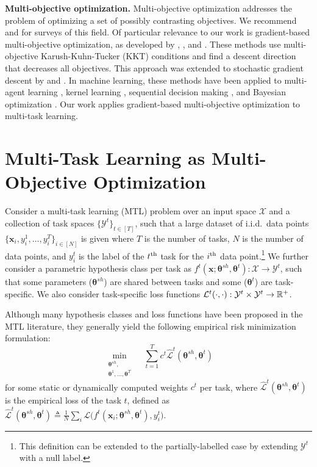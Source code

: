 \documentclass{article}
\def\xx{\mathbf{x}}
\def\lL{\mathcal{L}}
\def\xX{\mathcal{X}}
\def\yY{\mathcal{Y}}
\def\btheta{{\bm\theta}}
\begin{document}
\noindent \textbf{Multi-objective optimization.}
Multi-objective optimization addresses the problem of optimizing a set of possibly contrasting objectives. We recommend \citet{Miettinen1999} and \citet{Ehrgott2005} for surveys of this field. Of particular relevance to our work is gradient-based multi-objective optimization, as developed by \citet{Fliege2000}, \citet{Schaffler2002}, and \citet{Desideri2012}. These methods use multi-objective Karush-Kuhn-Tucker (KKT) conditions \citep{Kuhn1951} and find a descent direction that decreases all objectives. This approach was extended to stochastic gradient descent by \citet{Peitz2017} and \citet{Poirion2017}. In machine learning, these methods have been applied to multi-agent learning \citep{Ghish2013, Pirotta2016, Parisi2014}, kernel learning \citep{Cong2014}, sequential decision making \citep{Whiteson2018}, and Bayesian optimization \citep{Shah2016, Lobato2016}. Our work applies gradient-based multi-objective optimization to multi-task learning.
 

\section{Multi-Task Learning as Multi-Objective Optimization}
\label{sec:method}


Consider a multi-task learning (MTL) problem over an input space $\xX$ and a collection of task spaces $\{\yY^t\}_{t \in [T]}$, such that a large dataset of i.i.d.\ data points $\{\xx_i, y_i^1,\ldots,y^T_i\}_{i \in [N]}$ is given where $T$ is the number of tasks, $N$ is the number of data points, and $y^t_i$ is the label of the $t^{\textup{th}}$ task for the $i^{\textup{th}}$ data point.\footnote{This definition can be extended to the partially-labelled case by extending $\yY^t$ with a null label.} We further consider a parametric hypothesis class per task as $f^t(\xx;\btheta^{sh}, \btheta^t): \xX \rightarrow \yY^t$, such that some parameters ($\btheta^{sh}$) are shared between tasks and some ($\btheta^t$) are task-specific. We also consider task-specific loss functions $\lL^t(\cdot,\cdot): \yY^t \times \yY^t \rightarrow {\Bbb R}^+$.

Although many hypothesis classes and loss functions have been proposed in the MTL literature, they generally yield the following empirical risk minimization formulation:
\begin{equation}
\min_{\substack{\btheta^{sh},\\ \btheta^1,\ldots,\btheta^T}} \quad \sum_{t=1}^T c^t \hat{\lL}^t(\btheta^{sh},\btheta^t)
\label{eq:linear-combination}
\end{equation}
for some static or dynamically computed weights $c^t$ per task, where $\hat{\lL}^t(\btheta^{sh},\btheta^t)$ is the empirical loss of the task $t$, defined as $\hat{\lL}^t(\btheta^{sh},\btheta^t) \triangleq \frac{1}{N} \sum_{i} \lL\big(f^t(\xx_i;\btheta^{sh},\btheta^t), y_i^t\big)$.
\end{document}
